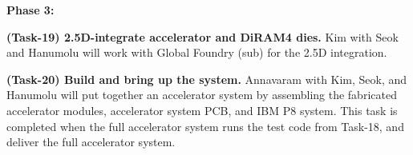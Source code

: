 \noindent
\textbf{Phase 3:}

\noindent
\textbf{(Task-19) 2.5D-integrate accelerator and DiRAM4 dies.}
Kim with Seok and Hanumolu will work with Global Foundry (sub) for the 2.5D integration.


\noindent
\textbf{(Task-20) Build and bring up the system.}
Annavaram with Kim, Seok, and Hanumolu will put together an accelerator system by assembling
the fabricated accelerator modules, accelerator system PCB, and IBM P8 system.
This task is completed when the full accelerator system runs the test code from Task-18, and deliver the full accelerator system.


\begin{comment}
Task 3.X: Our accelerator chip fabrication and chip-level testing \underline{Seok (Columbia), Kim (UIUC), Hanumolu (UIUC), Annavaram (USC), Hwu (UIUC)}
Completion criteria: fabricated chips, verified in the chip level
Approach: We will perform intensive pre-silicon verifications for functional, thermal, voltage integrity, noise, and testability aspects. We will tape-out the accelerator chip in a 28nm CMOS technology. We will test the accelerator chip without DiRAMs. 
Task 3.2: 2.5D integration of our accelerator chip and memory stacks, packaging, and testing \underline{?}
Completion criteria and deliverables: Functioning 2.5D integrated hardware of the accelerators and DiRAMs. 
Approach:  We will integrate the accelerator chip with two DiRAMs using a silicon interposer. 
The silicon interposer that creates 2,000 connection to the accelerator chip per DiRAM will be fabricated by a company (XXXXX). 
The interposer will be either connected to a custom PCB directly or enclosed on a BGA type package. 
If necessary, we will mount a off-the-shelf cooler, potentially modified to fit, on top of the accelerator chip. 
\end{comment}
